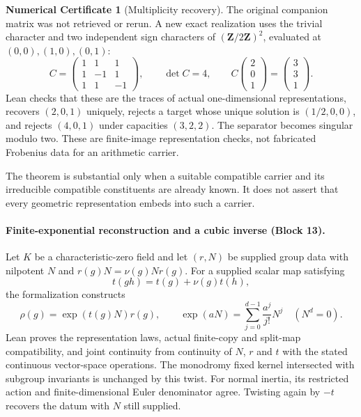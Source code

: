 \documentclass[11pt]{article}
\theoremstyle{definition}
\newtheorem{numericalcertificate}[theorem]{Numerical Certificate}
\theoremstyle{remark}
\begin{document}
\begin{numericalcertificate}[Multiplicity recovery]
The original companion matrix was not retrieved or rerun. A new exact
realization uses the trivial character and two independent sign characters
of $(\mathbf Z/2\mathbf Z)^2$, evaluated at $(0,0),(1,0),(0,1)$:
\[
 C=\begin{pmatrix}1&1&1\\1&-1&1\\1&1&-1\end{pmatrix},
 \qquad \det C=4,
 \qquad C\begin{pmatrix}2\\0\\1\end{pmatrix}
       =\begin{pmatrix}3\\3\\1\end{pmatrix}.
\]
Lean checks that these are the traces of actual one-dimensional
representations, recovers $(2,0,1)$ uniquely, rejects a target whose unique
solution is $(1/2,0,0)$, and rejects $(4,0,1)$ under capacities $(3,2,2)$.
The separator becomes singular modulo two. These are finite-image
representation checks, not fabricated Frobenius data for an arithmetic carrier.
\end{numericalcertificate}

The theorem is substantial only when a suitable compatible carrier and its irreducible compatible constituents are already known.  It does not assert that every geometric representation embeds into such a carrier.


\paragraph{Finite-exponential reconstruction and a cubic inverse (Block 13).}
Let $K$ be a characteristic-zero field and let $(r,N)$ be supplied group data
with nilpotent $N$ and $r(g)N=\nu(g)Nr(g)$. For a supplied scalar map satisfying
\[
t(gh)=t(g)+\nu(g)t(h),
\]
the formalization constructs
\[
\rho(g)=\exp(t(g)N)r(g),\qquad
\exp(aN)=\sum_{j=0}^{d-1}\frac{a^j}{j!}N^j\quad(N^d=0).
\]
Lean proves the representation laws, actual finite-copy and split-map
compatibility, and joint continuity from continuity of $N$, $r$ and $t$ with
the stated continuous vector-space operations. The monodromy fixed kernel
intersected with subgroup invariants is unchanged by this twist. For normal
inertia, its restricted action and finite-dimensional Euler denominator agree.
Twisting again by $-t$ recovers the datum with $N$ still supplied.
\end{document}
